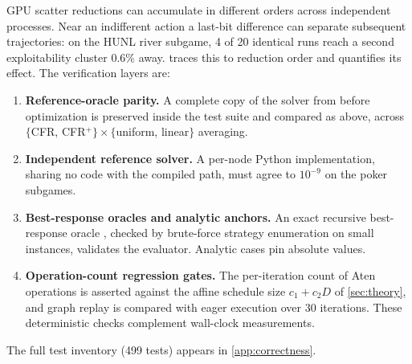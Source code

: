 GPU scatter reductions can accumulate in different orders across independent
processes. Near an indifferent action a last-bit difference can separate subsequent
trajectories: on the HUNL river subgame, 4 of 20 identical runs reach a second
exploitability cluster $0.6\%$ away.  traces this to
reduction order and quantifies its effect. The verification layers are:
\begin{enumerate}
    \item \textbf{Reference-oracle parity.} A complete copy of the solver from
    before optimization is preserved inside the test suite and compared as above,
    across $\{$CFR, CFR$^{+}\} \times \{$uniform, linear$\}$ averaging.
    \item \textbf{Independent reference solver.} A per-node Python implementation,
    sharing no code with the compiled path, must agree to $10^{-9}$ on the poker
    subgames.
    \item \textbf{Best-response oracles and analytic anchors.} An exact recursive best-response oracle \cite{johanson2011accelerating}, checked
    by brute-force strategy enumeration on small instances, validates the evaluator.
    Analytic cases pin absolute values.
    \item \textbf{Operation-count regression gates.} The per-iteration count of
    Aten operations is asserted against the affine schedule size $c_1 + c_2 D$ of
    \cref{sec:theory}, and graph replay is compared with eager execution over 30
    iterations. These deterministic checks complement wall-clock measurements.
\end{enumerate}
The full test inventory (499 tests) appears in \cref{app:correctness}.
